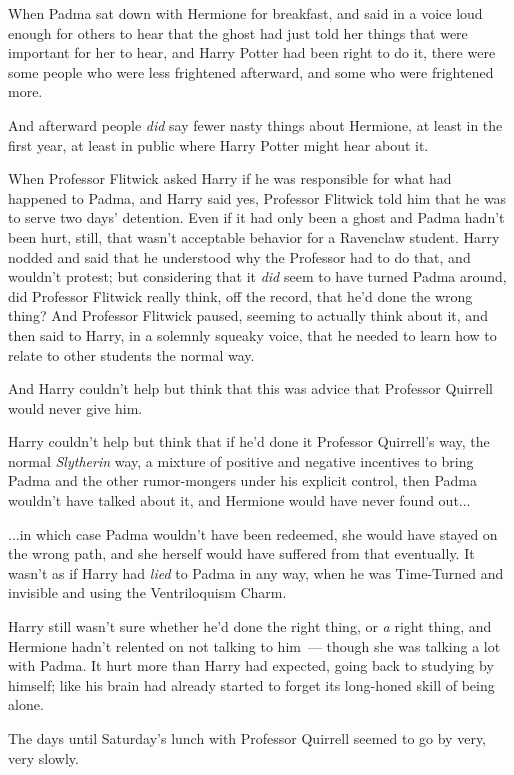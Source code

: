 When Padma sat down with Hermione for breakfast, and said in a voice loud enough for others to hear that the ghost had just told her things that were important for her to hear, and Harry Potter had been right to do it, there were some people who were less frightened afterward, and some who were frightened more.

And afterward people \emph{did} say fewer nasty things about Hermione, at least in the first year, at least in public where Harry Potter might hear about it.

When Professor Flitwick asked Harry if he was responsible for what had happened to Padma, and Harry said yes, Professor Flitwick told him that he was to serve two days' detention. Even if it had only been a ghost and Padma hadn't been hurt, still, that wasn't acceptable behavior for a Ravenclaw student. Harry nodded and said that he understood why the Professor had to do that, and wouldn't protest; but considering that it \emph{did} seem to have turned Padma around, did Professor Flitwick really think, off the record, that he'd done the wrong thing? And Professor Flitwick paused, seeming to actually think about it, and then said to Harry, in a solemnly squeaky voice, that he needed to learn how to relate to other students the normal way.

And Harry couldn't help but think that this was advice that Professor Quirrell would never give him.

Harry couldn't help but think that if he'd done it Professor Quirrell's way, the normal \emph{Slytherin} way, a mixture of positive and negative incentives to bring Padma and the other rumor-mongers under his explicit control, then Padma wouldn't have talked about it, and Hermione would have never found out...

...in which case Padma wouldn't have been redeemed, she would have stayed on the wrong path, and she herself would have suffered from that eventually. It wasn't as if Harry had \emph{lied} to Padma in any way, when he was Time-Turned and invisible and using the Ventriloquism Charm.

Harry still wasn't sure whether he'd done the right thing, or \emph{a} right thing, and Hermione hadn't relented on not talking to him~--- though she was talking a lot with Padma. It hurt more than Harry had expected, going back to studying by himself; like his brain had already started to forget its long-honed skill of being alone.

The days until Saturday's lunch with Professor Quirrell seemed to go by very, very slowly.
